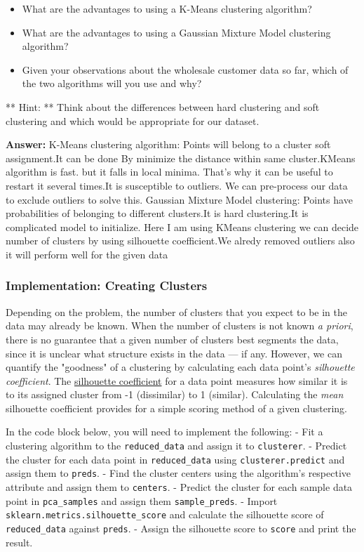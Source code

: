 \documentclass[11pt]{article}
\providecommand{\tightlist}{%
      \setlength{\itemsep}{0pt}\setlength{\parskip}{0pt}}
\begin{document}
\begin{itemize}
\tightlist
\item
  What are the advantages to using a K-Means clustering algorithm?
\item
  What are the advantages to using a Gaussian Mixture Model clustering
  algorithm?
\item
  Given your observations about the wholesale customer data so far,
  which of the two algorithms will you use and why?
\end{itemize}

** Hint: ** Think about the differences between hard clustering and soft
clustering and which would be appropriate for our dataset.

    \textbf{Answer:} K-Means clustering algorithm: Points will belong to a
cluster soft assignment.It can be done By minimize the distance within
same cluster.KMeans algorithm is fast. but it falls in local minima.
That's why it can be useful to restart it several times.It is
susceptible to outliers. We can pre-process our data to exclude outliers
to solve this. Gaussian Mixture Model clustering: Points have
probabilities of belonging to different clusters.It is hard
clustering.It is complicated model to initialize. Here I am using KMeans
clustering we can decide number of clusters by using silhouette
coefficient.We alredy removed outliers also it will perform well for the
given data

    \subsubsection{Implementation: Creating
Clusters}\label{implementation-creating-clusters}

Depending on the problem, the number of clusters that you expect to be
in the data may already be known. When the number of clusters is not
known \emph{a priori}, there is no guarantee that a given number of
clusters best segments the data, since it is unclear what structure
exists in the data --- if any. However, we can quantify the "goodness"
of a clustering by calculating each data point's \emph{silhouette
coefficient}. The
\href{http://scikit-learn.org/stable/modules/generated/sklearn.metrics.silhouette_score.html}{silhouette
coefficient} for a data point measures how similar it is to its assigned
cluster from -1 (dissimilar) to 1 (similar). Calculating the \emph{mean}
silhouette coefficient provides for a simple scoring method of a given
clustering.

In the code block below, you will need to implement the following: - Fit
a clustering algorithm to the \texttt{reduced\_data} and assign it to
\texttt{clusterer}. - Predict the cluster for each data point in
\texttt{reduced\_data} using \texttt{clusterer.predict} and assign them
to \texttt{preds}. - Find the cluster centers using the algorithm's
respective attribute and assign them to \texttt{centers}. - Predict the
cluster for each sample data point in \texttt{pca\_samples} and assign
them \texttt{sample\_preds}. - Import
\texttt{sklearn.metrics.silhouette\_score} and calculate the silhouette
score of \texttt{reduced\_data} against \texttt{preds}. - Assign the
silhouette score to \texttt{score} and print the result.
\end{document}
